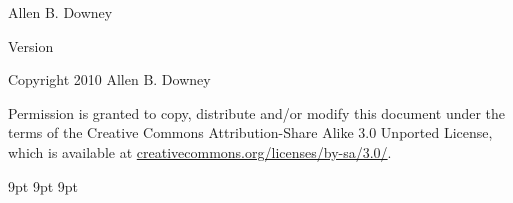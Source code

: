 \documentclass{book}
\begin{document}

\begin{htmlonly}


{\Large \thetitle}

{\large Allen B. Downey}

Version \theversion

\setcounter{chapter}{-1}

Copyright 2010 Allen B. Downey

\vspace{0.25in}

Permission is granted to copy, distribute and/or modify this document
under the terms of the Creative Commons Attribution-Share Alike 3.0
Unported License, which is available at
\url{creativecommons.org/licenses/by-sa/3.0/}.

\end{htmlonly}


   {9pt}%
   {9pt}%
   {\itshape}%
   {}%
   {\bfseries}%
   {}%
   {9pt}%
   {}%

\theoremstyle{myex}
\newtheorem{ex}{Exercise}[chapter]


% 

\tableofcontents


\mainmatter

% 
% 
% 
% 
% 
% 
% 
% 
% 
% 
% 
% 
% 
% 

% 
% 
% 
% 
% 
% 
% 
% 



\newpage
\end{document}
